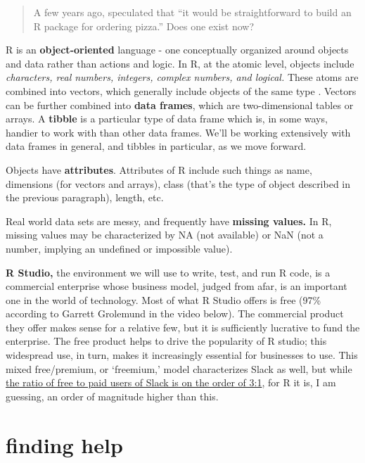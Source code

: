 \documentclass[
  openany]{book}
\begin{document}
\begin{quote}
A few years ago, \citet{peng2015r} speculated that ``it would be straightforward to build an R package for ordering pizza.'' Does one exist now?
\end{quote}

R is an \textbf{object-oriented} language - one conceptually organized around objects and data rather than actions and logic. In R, at the atomic level, objects include \emph{characters, real numbers, integers, complex numbers, and logical.} These atoms are combined into vectors, which generally include objects of the same type \citep[one kind of object, `lists,' is an exception to this;][]{peng2015r}. Vectors can be further combined into \textbf{data frames}, which are two-dimensional tables or arrays. A \textbf{tibble} is a particular type of data frame which is, in some ways, handier to work with than other data frames. We'll be working extensively with data frames in general, and tibbles in particular, as we move forward.

Objects have \textbf{attributes}. Attributes of R include such things as name, dimensions (for vectors and arrays), class (that's the type of object described in the previous paragraph), length, etc.

Real world data sets are messy, and frequently have \textbf{missing values.} In R, missing values may be characterized by NA (not available) or NaN (not a number, implying an undefined or impossible value).

\textbf{R Studio,} the environment we will use to write, test, and run R code, is a commercial enterprise whose business model, judged from afar, is an important one in the world of technology. Most of what R Studio offers is free (97\% according to Garrett Grolemund in the video below). The commercial product they offer makes sense for a relative few, but it is sufficiently lucrative to fund the enterprise. The free product helps to drive the popularity of R studio; this widespread use, in turn, makes it increasingly essential for businesses to use. This mixed free/premium, or `freemium,' model characterizes Slack as well, but while \href{https://www.statista.com/statistics/652779/worldwide-slack-users-total-vs-paid/}{the ratio of free to paid users of Slack is on the order of 3:1}, for R it is, I am guessing, an order of magnitude higher than this.

\hypertarget{finding-help}{%
\section{finding help}\label{finding-help}}
\end{document}
